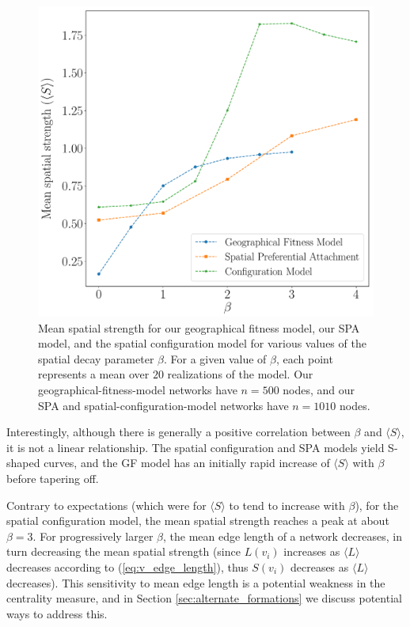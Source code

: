 \documentclass[%
 reprint,
 amsmath,amssymb,
 aps,
]{revtex4-1}
\begin{document}
\begin{figure}
    \centering
    \includegraphics[width=1.0\linewidth]{spatial_model_spatial_strengths2.pdf}
    \caption{Mean spatial strength for our geographical fitness model, our SPA model, and the spatial configuration model for various values of the spatial decay parameter $\beta$. For a given value of $\beta$, each point represents a mean over $20$ realizations of the model. Our geographical-fitness-model networks have $n=500$ nodes, and our SPA and spatial-configuration-model networks have $n=1010$ nodes.
    }
    \label{fig:spatial_model_strength}
\end{figure}


Interestingly, although there is generally a positive correlation between $\beta$ and $\langle S \rangle$, it is not a linear relationship. The spatial configuration and SPA models yield S-shaped curves, and the GF model has an initially rapid increase of $\langle S \rangle$ with $\beta$ before tapering off.

Contrary to expectations (which were for $\langle S \rangle$ to tend to increase with $\beta$), for the spatial configuration model, the mean spatial strength reaches a peak at about $\beta = 3$.
 {\color{red}For progressively larger $\beta$, the mean edge length of a network decreases, in turn decreasing the mean spatial strength (since $L(v_i)$ increases as $\langle L \rangle$ decreases according to (\ref{eq:v_edge_length}), thus $S(v_i)$ decreases as $\langle L \rangle$ decreases). This sensitivity to mean edge length is a potential weakness in the centrality measure, and in Section \ref{sec:alternate_formations} we discuss potential ways to address this. }
\end{document}
